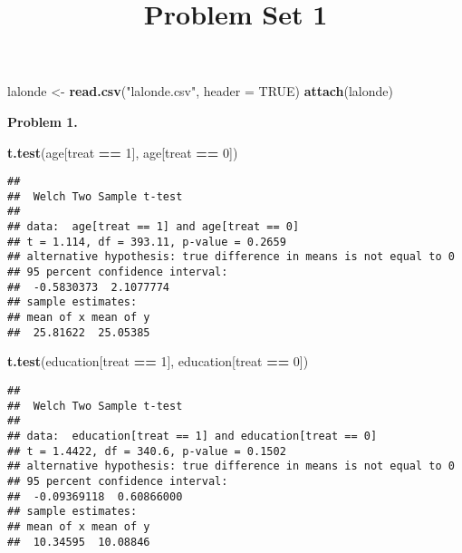 \documentclass[
]{article}
\title{Problem Set 1}
\author{}
\date{\vspace{-2.5em}}
\newenvironment{Shaded}{\begin{snugshade}}{\end{snugshade}}
\newcommand{\DataTypeTok}[1]{\textcolor[rgb]{0.13,0.29,0.53}{#1}}
\newcommand{\DecValTok}[1]{\textcolor[rgb]{0.00,0.00,0.81}{#1}}
\newcommand{\KeywordTok}[1]{\textcolor[rgb]{0.13,0.29,0.53}{\textbf{#1}}}
\newcommand{\NormalTok}[1]{#1}
\newcommand{\OperatorTok}[1]{\textcolor[rgb]{0.81,0.36,0.00}{\textbf{#1}}}
\newcommand{\OtherTok}[1]{\textcolor[rgb]{0.56,0.35,0.01}{#1}}
\newcommand{\StringTok}[1]{\textcolor[rgb]{0.31,0.60,0.02}{#1}}
\begin{document}
\maketitle

\begin{Shaded}
\begin{Highlighting}[]
\NormalTok{lalonde <-}\StringTok{ }\KeywordTok{read.csv}\NormalTok{(}\StringTok{"lalonde.csv"}\NormalTok{, }\DataTypeTok{header =} \OtherTok{TRUE}\NormalTok{)}
\KeywordTok{attach}\NormalTok{(lalonde)}
\end{Highlighting}
\end{Shaded}

\textbf{Problem 1.}

\begin{Shaded}
\begin{Highlighting}[]
\KeywordTok{t.test}\NormalTok{(age[treat }\OperatorTok{==}\StringTok{ }\DecValTok{1}\NormalTok{], age[treat }\OperatorTok{==}\StringTok{ }\DecValTok{0}\NormalTok{])}
\end{Highlighting}
\end{Shaded}

\begin{verbatim}
## 
##  Welch Two Sample t-test
## 
## data:  age[treat == 1] and age[treat == 0]
## t = 1.114, df = 393.11, p-value = 0.2659
## alternative hypothesis: true difference in means is not equal to 0
## 95 percent confidence interval:
##  -0.5830373  2.1077774
## sample estimates:
## mean of x mean of y 
##  25.81622  25.05385
\end{verbatim}

\begin{Shaded}
\begin{Highlighting}[]
\KeywordTok{t.test}\NormalTok{(education[treat }\OperatorTok{==}\StringTok{ }\DecValTok{1}\NormalTok{], education[treat }\OperatorTok{==}\StringTok{ }\DecValTok{0}\NormalTok{])}
\end{Highlighting}
\end{Shaded}

\begin{verbatim}
## 
##  Welch Two Sample t-test
## 
## data:  education[treat == 1] and education[treat == 0]
## t = 1.4422, df = 340.6, p-value = 0.1502
## alternative hypothesis: true difference in means is not equal to 0
## 95 percent confidence interval:
##  -0.09369118  0.60866000
## sample estimates:
## mean of x mean of y 
##  10.34595  10.08846
\end{verbatim}
\end{document}
